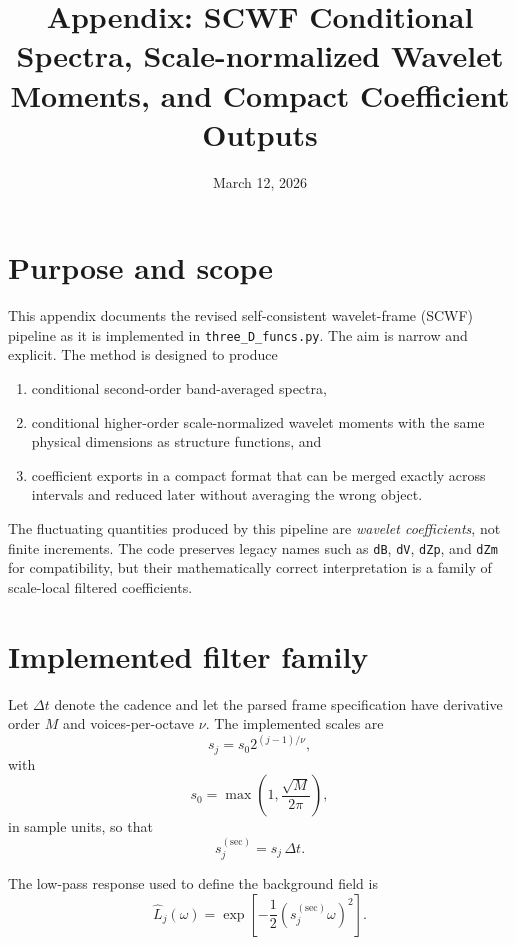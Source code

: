 \documentclass[11pt]{article}
\title{Appendix: SCWF Conditional Spectra, Scale-normalized Wavelet Moments, and Compact Coefficient Outputs}
\author{}
\date{March 12, 2026}
\begin{document}
\maketitle

\section{Purpose and scope}

This appendix documents the revised self-consistent wavelet-frame (SCWF) pipeline as it is implemented in \texttt{three\_D\_funcs.py}. The aim is narrow and explicit. The method is designed to produce
\begin{enumerate}[leftmargin=1.5em]
    \item conditional second-order band-averaged spectra,
    \item conditional higher-order scale-normalized wavelet moments with the same physical dimensions as structure functions, and
    \item coefficient exports in a compact format that can be merged exactly across intervals and reduced later without averaging the wrong object.
\end{enumerate}

The fluctuating quantities produced by this pipeline are \emph{wavelet coefficients}, not finite increments. The code preserves legacy names such as \texttt{dB}, \texttt{dV}, \texttt{dZp}, and \texttt{dZm} for compatibility, but their mathematically correct interpretation is a family of scale-local filtered coefficients.

\section{Implemented filter family}

Let $\Delta t$ denote the cadence and let the parsed frame specification have derivative order $M$ and voices-per-octave $\nu$. The implemented scales are
\begin{equation}
 s_j = s_0 2^{(j-1)/\nu},
\end{equation}
with
\begin{equation}
 s_0 = \max\!\left(1, \frac{\sqrt{M}}{2\pi}\right),
\end{equation}
in sample units, so that
\begin{equation}
 s_j^{(\mathrm{sec})} = s_j\,\Delta t.
\end{equation}

The low-pass response used to define the background field is
\begin{equation}
 \widehat{L}_j(\omega) = \exp\!\left[-\frac{1}{2}(s_j^{(\mathrm{sec})}\omega)^2\right].
\end{equation}
\end{document}
